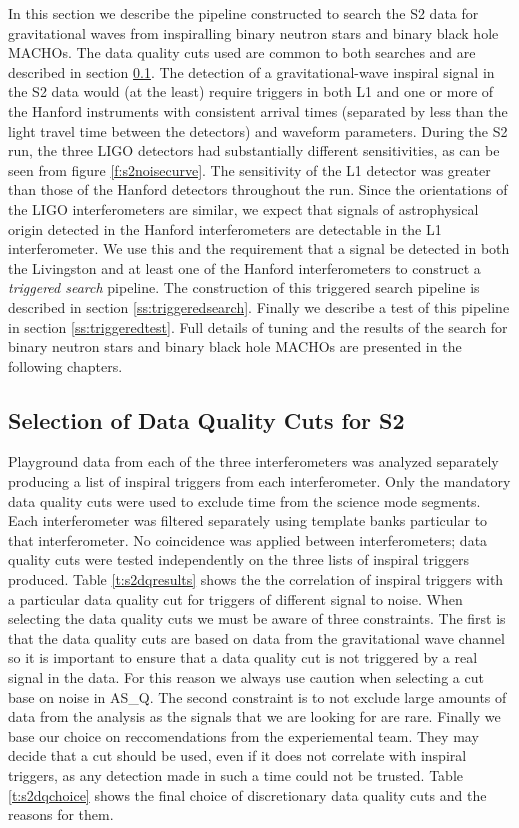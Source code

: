 In this section we describe the pipeline constructed to search the S2 data for
gravitational waves from inspiralling binary neutron stars and binary black
hole MACHOs. The data quality cuts used are common to both searches and are
described in section \ref{ss:s2dqselection}. The detection of a
gravitational-wave inspiral signal in the S2 data would (at the least) require
triggers in both L1 and one or more of the Hanford instruments with consistent
arrival times (separated by less than the light travel time between the
detectors) and waveform parameters. During the S2 run, the three LIGO
detectors had substantially different sensitivities, as can be seen from
figure \ref{f:s2noisecurve}. The sensitivity of the L1 detector was greater
than those of the Hanford detectors throughout the run. Since the orientations
of the LIGO interferometers are similar, we expect that signals of
astrophysical origin detected in the Hanford interferometers are detectable in
the L1 interferometer.  We use this and the requirement that a signal be
detected in both the Livingston and at least one of the Hanford
interferometers to construct a {\em triggered search} pipeline. The
construction of this triggered search pipeline is described in section
\ref{ss:triggeredsearch}. Finally we describe a test of this pipeline in
section \ref{ss:triggeredtest}. Full details of tuning and the results of the
search for binary neutron stars and binary black hole MACHOs are presented in
the following chapters.

\subsection{Selection of Data Quality Cuts for S2}
\label{ss:s2dqselection}

Playground data from each of the three interferometers was analyzed separately
producing a list of inspiral triggers from each interferometer. Only the
mandatory data quality cuts were used to exclude time from the science mode
segments. Each interferometer was filtered separately using template banks
particular to that interferometer. No coincidence was applied between
interferometers; data quality cuts were tested independently on the three
lists of inspiral triggers produced. Table \ref{t:s2dqresults} shows the the
correlation of inspiral triggers with a particular data quality cut for
triggers of different signal to noise. When selecting the data quality cuts we
must be aware of three constraints. The first is that the data quality cuts
are based on data from the gravitational wave channel so it is important to
ensure that a data quality cut is not triggered by a real signal in the data.
For this reason we always use caution when selecting a cut base on noise in
AS\_Q.  The second constraint is to not exclude large amounts of data from the
analysis as the signals that we are looking for are rare. Finally we base our
choice on reccomendations from the experiemental team. They may decide that a
cut should be used, even if it does not correlate with inspiral triggers, as
any detection made in such a time could not be trusted. Table
\ref{t:s2dqchoice} shows the final choice of discretionary data quality cuts
and the reasons for them.

